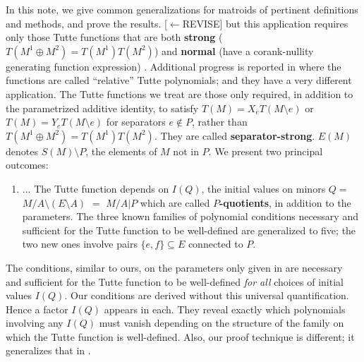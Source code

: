 

In this note, we give common generalizations
for matroids of pertinent definitions and methods,
and prove the results. [$\leftarrow$REVISE]
but this application requires only those Tutte 
functions that are both {\bf strong} 
($T(M^1\oplus M^2)=T(M^1)T(M^2)$) and {\bf normal}
(have a corank-nullity generating function expression)
\cite{MR93a:05047}.  Additional progress is reported
in \cite{RelTuttePoly} where the functions
are called ``relative'' Tutte polynomials; and 
they have a very different application.
The Tutte functions we treat are those only required,
in addition to the parametrized additive identity,
to satisfy $T(M)=X_eT(M\setminus e)$ or
$T(M)=Y_eT(M\setminus e)$ for separators $e\not\in P$,
rather than $T(M^1\oplus M^2)=T(M^1)T(M^2)$.  
They are called {\bf separator-strong}\cite{JoAndTom}.
$E(M)$ denotes $S(M)\setminus P$, the
elements of $M$ not in $P$.
We present
two principal outcomes:
\begin{enumerate}
\item
...
  The Tutte function
depends on $I(Q)$, the initial values on
minors $Q = $ $M/A\setminus (E\setminus A)$
$=$ $M/A|P$ which are called {\bf $P$-quotients},
in addition to the parameters.  The three known
\cite{MR93a:05047,BollobasRiordanTuttePolyColored,Ellis-Monaghan-Traldi}
families
of polynomial conditions necessary and sufficient 
for the Tutte function to be well-defined 
are generalized to five; the two new ones involve
pairs $\{e,f\}\subseteq E$ connected to $P$.  

\end{enumerate}

The conditions, similar to ours, on the parameters 
only given in \cite{RelTuttePoly}
are necessary and sufficient
for the Tutte function to be well-defined
\emph{for all} choices of initial values $I(Q)$.
Our conditions are derived without
this universal quantification.  Hence a factor $I(Q)$
appears in each.  They reveal 
exactly which polynomials involving any $I(Q)$
must vanish depending on the structure of 
the family on which the Tutte function is
well-defined.  Also, our proof technique is
different; it generalizes that 
in \cite{Ellis-Monaghan-Traldi}.

